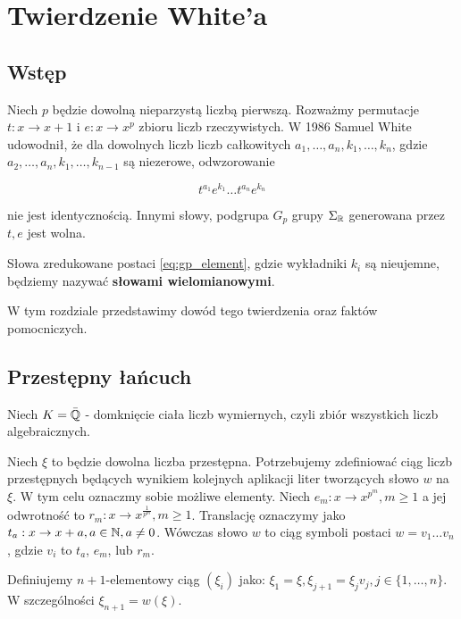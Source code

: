\chapter{Twierdzenie White'a}

\section{Wstęp}

Niech $p$ będzie dowolną nieparzystą liczbą pierwszą. Rozważmy permutacje $t :
x \rightarrow  x+1$ i $e: x \rightarrow x^p$ zbioru liczb rzeczywistych. W 1986
Samuel White \cite{whi88} udowodnił, że dla dowolnych liczb liczb całkowitych
$a_1, \ldots, a_n, k_1, \ldots, k_n$, gdzie $a_2, \ldots, a_n, k_1, \ldots,
k_{n-1}$ są niezerowe, odwzorowanie 

\begin{equation}
  t^{a_1}e^{k_1}\ldots t^{a_n}e^{k_n}
\label{eq:gp_element}
\end{equation}

nie jest identycznością.  Innymi słowy, podgrupa $G_p$ grupy $\Sigma_{\mathbb{R}}$
generowana przez $t, e$ jest wolna.

Słowa zredukowane postaci \ref{eq:gp_element}, gdzie wykładniki $k_i$ są
nieujemne, będziemy nazywać \textbf{słowami wielomianowymi}.

W tym rozdziale przedstawimy dowód tego twierdzenia oraz faktów pomocniczych.

\section{Przestępny łańcuch}
\label{sec:przelan}

Niech $K = \bar{\mathbb{Q}}$ - domknięcie ciała liczb wymiernych, czyli zbiór wszystkich
liczb algebraicznych.

Niech $\xi$ to będzie dowolna liczba przestępna. Potrzebujemy zdefiniować ciąg
liczb przestępnych będących wynikiem kolejnych aplikacji liter tworzących słowo
$w$ na $\xi$. W tym celu oznaczmy sobie możliwe elementy. Niech $e_m: x
\rightarrow x^{p^m}, m \geq 1$ a jej odwrotność to $r_m: x \rightarrow
x^{\frac{1}{p^m}}, m \geq 1$. Translację oznaczymy jako $t_a: x \rightarrow x +
a, a \in \mathbb{N}, a \neq 0$.  Wówczas słowo $w$ to ciąg symboli postaci $w =
v_1\ldots v_n$, gdzie $v_i$ to $t_a$, $e_m$, lub $r_m$. 

Definiujemy $n+1$-elementowy ciąg $\left(\xi_i\right)$ jako: $\xi_1 = \xi,
\xi_{j+1} = \xi_{j}v_j, j \in \{1, \ldots, n\}$. W szczególności $\xi_{n+1} =
w(\xi)$.

